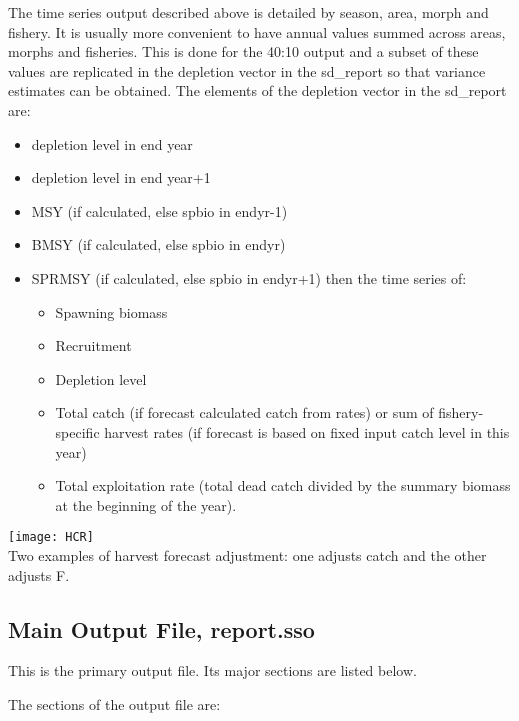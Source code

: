 The time series output described above is detailed by season, area, morph and fishery.  It is usually more convenient to have annual values summed across areas, morphs and fisheries.  This is done for the 40:10 output and a subset of these values are replicated in the depletion vector in the sd\_report so that variance estimates can be obtained.  The elements of the depletion vector in the sd\_report are:
\begin{itemize}
	\item depletion level in end year
	\item depletion level in end year+1
	\item MSY (if calculated, else spbio in endyr-1)
	\item BMSY (if calculated, else spbio in endyr)
	\item SPRMSY (if calculated, else spbio in endyr+1) then the time series of:
	\begin{itemize}
		\item Spawning biomass
		\item Recruitment
		\item Depletion level
		\item Total catch (if forecast calculated catch from rates) or sum of fishery-specific harvest rates (if forecast is based on fixed input catch level in this year)
		\item Total exploitation rate (total dead catch divided by the summary biomass at the beginning of the year).
	\end{itemize}
\end{itemize}

\begin{center}
	\texttt{[image: HCR]}\\
	Two examples of harvest forecast adjustment: one adjusts catch and the other adjusts F.
\end{center}

\subsection{Main Output File, report.sso}
This is the primary output file.  Its major sections are listed below.  

The sections of the output file are:
